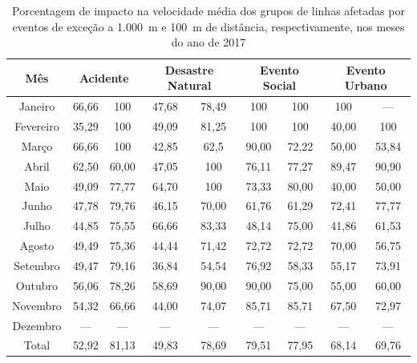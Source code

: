 \documentclass[
	12pt,				%
	oneside,			%
	a4paper,			%
	english,			%
	brazil				%
	]{abntex2ppgsi}
\begin{document}
{{{\begin{table}[!htb]
\centering
\caption {Porcentagem de impacto na velocidade média dos grupos de linhas afetadas por eventos de exceção a 1.000~m e 100~m de distância, respectivamente, nos meses do ano de 2017}
\label{tab:exceptEventVelocityImpAllShapes}
\begin{tabular}{c|cc|cc|cc|cc}
\toprule
\textbf{Mês} & \multicolumn{2}{c}{\textbf{Acidente}} & \multicolumn{2}{c}{\textbf{Desastre Natural}} & \multicolumn{2}{c}{\textbf{Evento Social}} &
\multicolumn{2}{c}{\textbf{Evento Urbano}}\\
\midrule
Janeiro & 66,66 &  100 & 
 47,68 &  78,49 & 
 100 & 100 &
 100 & --- \\
\hline
Fevereiro & 35,29  &  100 &
 49,09 &  81,25 &
 100 & 100 &
 40,00 & 100 \\
\hline
Março  & 66,66  &  100 & 
 42,85 &  62,5 &
90,00 & 72,22 &
50,00 & 53,84 \\
\hline
Abril & 62,50 & 60,00 & 
47,05  & 100 & 
76,11 & 77,27 & 
89,47 &  90,90\\
\hline
Maio & 49,09 &  77,77 &
64,70 &  100 &
73,33 & 80,00 &
40,00 & 50,00 \\
\hline
Junho & 47,78 &  79,76 &
 46,15 &  70,00 &
 61,76 & 61,29 &
72,41 & 77,77 \\
\hline
Julho & 44,85  &  75,55 &
 66,66  & 83,33 &
48,14  & 75,00 &
41,86 & 61,53 \\
\hline
Agosto & 49,49 & 75,36 &
  44,44 & 71,42 &
  72,72 & 72,72 & 
70,00  & 56,75 \\
\hline
Setembro & 49,47  & 79,16 &
36,84  & 54,54 &
76,92  & 58,33 & 
55,17 & 73,91 \\
\hline
Outubro & 56,06 & 78,26 &
58,69  & 90,00 &
90,00  & 75,00 &
55,00 & 60,00 \\
\hline
Novembro & 54,32 & 66,66 &
 44,00 & 74,07 &
85,71  & 85,71 &
67,50  & 72,97 \\
\hline
Dezembro & --- & --- & --- & --- & --- & --- & --- & ---  \\
\midrule
\midrule
Total & 52,92 & 81,13 & 49,83 & 78,69 & 79,51 & 77,95 & 68,14 & 69,76  \\
\bottomrule
\end{tabular}
\end{table}


}}}
\end{document}
